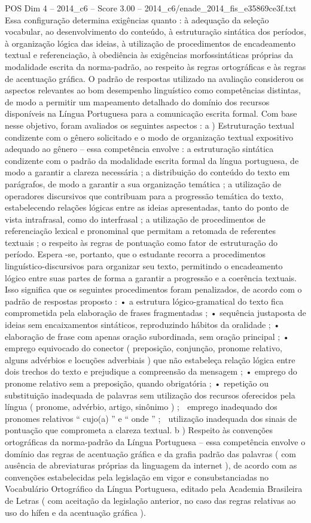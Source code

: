 \begin{textsample}{POS Dim 4 – 2014\_c6 – Score 3.00 – 2014\_c6/enade\_2014\_fis\_e35869ce3f.txt}
Essa configuração determina exigências quanto : à adequação da seleção vocabular, ao desenvolvimento do conteúdo, à estruturação sintática dos períodos, à organização lógica das ideias, à utilização de procedimentos de encadeamento textual e referenciação, à obediência às exigências morfossintáticas próprias da modalidade escrita da norma-padrão, ao respeito às regras ortográficas e às regras de acentuação gráfica.
O padrão de respostas utilizado na avaliação considerou os aspectos relevantes ao bom desempenho linguístico como competências distintas, de modo a permitir um mapeamento detalhado do domínio dos recursos disponíveis na Língua Portuguesa para a comunicação escrita formal.
Com base nesse objetivo, foram avaliados os seguintes aspectos : a ) Estruturação textual condizente com o gênero solicitado e o modo de organização textual expositivo adequado ao gênero – essa competência envolve : a estruturação sintática condizente com o padrão da modalidade escrita formal da língua portuguesa, de modo a garantir a clareza necessária ; a distribuição do conteúdo do texto em parágrafos, de modo a garantir a sua organização temática ; a utilização de operadores discursivos que contribuam para a progressão temática do texto, estabelecendo relações lógicas entre as ideias apresentadas, tanto do ponto de vista intrafrasal, como do interfrasal ; a utilização de procedimentos de referenciação lexical e pronominal que permitam a retomada de referentes textuais ; o respeito às regras de pontuação como fator de estruturação do período.
Espera -se, portanto, que o estudante recorra a procedimentos linguístico-discursivos para organizar seu texto, permitindo o encadeamento lógico entre suas partes de forma a garantir a progressão e a coerência textuais.
Isso significa que os seguintes procedimentos foram penalizados, de acordo com o padrão de respostas proposto : • a estrutura lógico-gramatical do texto fica comprometida pela elaboração de frases fragmentadas ; • sequência justaposta de ideias sem encaixamentos sintáticos, reproduzindo hábitos da oralidade ; • elaboração de frase com apenas oração subordinada, sem oração principal ; • emprego equivocado do conector ( preposição, conjunção, pronome relativo, alguns advérbios e locuções adverbiais ) que não estabeleça relação lógica entre dois trechos do texto e prejudique a compreensão da mensagem ; • emprego do pronome relativo sem a preposição, quando obrigatória ; • repetição ou substituição inadequada de palavras sem utilização dos recursos oferecidos pela língua ( pronome, advérbio, artigo, sinônimo ) ;  emprego inadequado dos pronomes relativos “ cujo(a) ” e “ onde ” ;  utilização inadequada dos sinais de pontuação que comprometa a clareza textual. b ) Respeito às convenções ortográficas da norma-padrão da Língua Portuguesa – essa competência envolve o domínio das regras de acentuação gráfica e da grafia padrão das palavras ( com ausência de abreviaturas próprias da linguagem da internet ), de acordo com as convenções estabelecidas pela legislação em vigor e consubstanciadas no Vocabulário Ortográfico da Língua Portuguesa, editado pela Academia Brasileira de Letras ( com aceitação da legislação anterior, no caso das regras relativas ao uso do hífen e da acentuação gráfica ).

\end{textsample}
